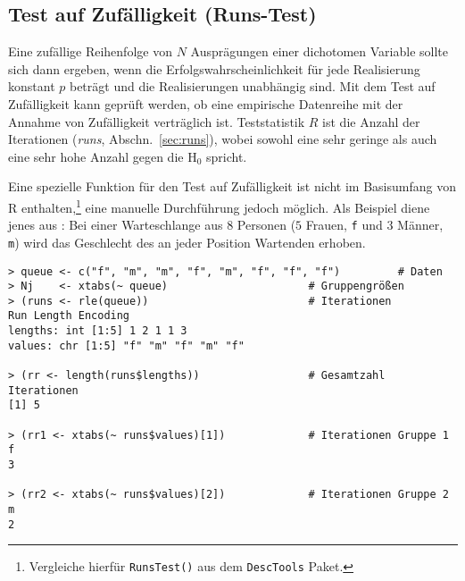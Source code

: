 \subsection{Test auf Zufälligkeit (Runs-Test)}
\label{sec:runsTest}

Eine zufällige Reihenfolge von $N$ Ausprägungen einer dichotomen Variable sollte sich dann ergeben, wenn die Erfolgswahrscheinlichkeit für jede Realisierung konstant $p$ beträgt und die Realisierungen unabhängig sind. Mit dem Test auf Zufälligkeit kann geprüft werden, ob eine empirische Datenreihe mit der Annahme von Zufälligkeit verträglich ist. Teststatistik $R$ ist die Anzahl der Iterationen (\emph{runs}, Abschn.\ \ref{sec:runs}), wobei sowohl eine sehr geringe als auch eine sehr hohe Anzahl gegen die $\text{H}_{0}$ spricht.

Eine spezielle Funktion für den Test auf Zufälligkeit ist nicht im Basisumfang von R enthalten,\footnote{Vergleiche hierfür \lstinline!RunsTest()! aus dem \lstinline!DescTools! Paket.} eine manuelle Durchführung jedoch möglich. Als Beispiel diene jenes aus : Bei einer Warteschlange aus $8$ Personen ($5$ Frauen, \lstinline!f! und $3$ Männer, \lstinline!m!) wird das Geschlecht des an jeder Position Wartenden erhoben.
\begin{lstlisting}
> queue <- c("f", "m", "m", "f", "m", "f", "f", "f")         # Daten
> Nj    <- xtabs(~ queue)                      # Gruppengrößen
> (runs <- rle(queue))                         # Iterationen
Run Length Encoding
lengths: int [1:5] 1 2 1 1 3
values: chr [1:5] "f" "m" "f" "m" "f"

> (rr <- length(runs$lengths))                 # Gesamtzahl Iterationen
[1] 5

> (rr1 <- xtabs(~ runs$values)[1])             # Iterationen Gruppe 1
f
3

> (rr2 <- xtabs(~ runs$values)[2])             # Iterationen Gruppe 2
m
2
\end{lstlisting}

